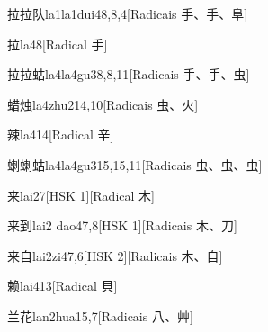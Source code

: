 \begin{entry}{拉拉队}{la1la1dui4}{8,8,4}[Radicais ⼿、⼿、⾩]
\end{entry}

\begin{entry}{拉}{la4}{8}[Radical ⼿]
\end{entry}

\begin{entry}{拉拉蛄}{la4la4gu3}{8,8,11}[Radicais ⼿、⼿、⾍]
\end{entry}

\begin{entry}{蜡烛}{la4zhu2}{14,10}[Radicais ⾍、⽕]
\end{entry}

\begin{entry}{辣}{la4}{14}[Radical ⾟]
\end{entry}

\begin{entry}{蝲蝲蛄}{la4la4gu3}{15,15,11}[Radicais ⾍、⾍、⾍]
\end{entry}

\begin{entry}{来}{lai2}{7}[HSK 1][Radical ⽊]
\end{entry}

\begin{entry}{来到}{lai2 dao4}{7,8}[HSK 1][Radicais ⽊、⼑]
\end{entry}

\begin{entry}{来自}{lai2zi4}{7,6}[HSK 2][Radicais ⽊、⾃]
\end{entry}

\begin{entry}{赖}{lai4}{13}[Radical ⾙]
\end{entry}

\begin{entry}{兰花}{lan2hua1}{5,7}[Radicais ⼋、⾋]
\end{entry}

